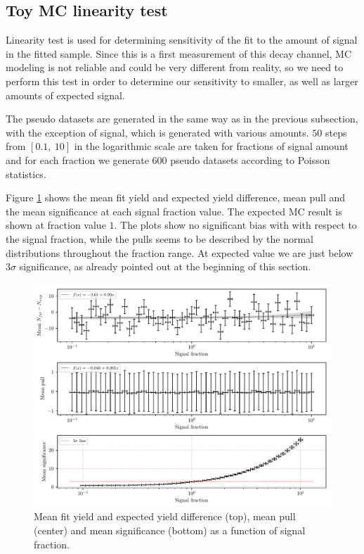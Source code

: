 \documentclass[headings=standardclasses,headings=big,oneside,a4paper,openany,12pt]{scrbook}
\begin{document}
\subsection{Toy MC linearity test}
Linearity test is used for determining sensitivity of the fit to the amount of signal in the fitted sample. Since this is a first measurement of this decay channel, MC modeling is not reliable and could be very different from reality, so we need to perform this test in order to determine our sensitivity to smaller, as well as larger amounts of expected signal.

The pseudo datasets are generated in the same way as in the previous subsection, with the exception of signal, which is generated with various amounts. $50$ steps from $[0.1,~10]$ in the logarithmic scale are taken for fractions of signal amount and for each fraction we generate 600 pseudo datasets according to Poisson statistics.

Figure \ref{fig:lin_test} shows the mean fit yield and expected yield difference, mean pull and the mean significance at each signal fraction value. The expected MC result is shown at fraction value $1$. The plots show no significant bias with with respect to the signal fraction, while the pulls seems to be described by the normal distributions throughout the fraction range. At expected value we are just below $3\sigma$ significance, as already pointed out at the beginning of this section.

\begin{figure}[H]
	\centering
	\captionsetup{width=0.8\linewidth}
	\includegraphics[width=\linewidth]{fig/lin_test}
	\caption{Mean fit yield and expected yield difference (top), mean pull (center) and mean significance (bottom) as a function of signal fraction.}
	\label{fig:lin_test}
\end{figure}
\end{document}
